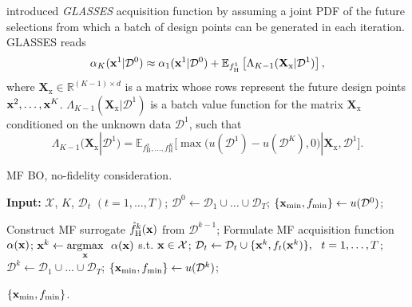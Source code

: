 \documentclass[journal ]{new-aiaa}
\begin{document}
\citet{Gonzalez2016} introduced \textit{GLASSES} acquisition function by assuming a joint PDF of the future selections from which a batch of design points can be generated in each iteration.
GLASSES reads
\begin{equation}\label{eqn54}
		\alpha_K({\bf x}^1|\mathcal{D}^0) \approx \alpha_1({\bf x}^1|\mathcal{D}^0) + \mathbb{E}_{f^1_\text{H}}\left[\Lambda_{K-1}(\textbf{X}_\text{x}|\mathcal{D}^1)\right],
\end{equation}
where 
$\textbf{X}_\text{x} \in \mathbb{R}^{(K-1) \times d}$ is a matrix whose rows represent the future design points ${\bf x}^2,\dots,{\bf x}^K$. $\Lambda_{K-1}(\textbf{X}_\text{x}|\mathcal{D}^1)$ is a batch value function for the matrix  $\textbf{X}_\text{x}$ conditioned on the unknown data $\mathcal{D}^1$, such that 
\begin{equation}\label{eqn55}
    \Lambda_{K-1}(\textbf{X}_\text{x}|\mathcal{D}^1)
    =\mathbb{E}_{f_\text{H}^2,\dots,f_\text{H}^K}\Bigg[\max\Big(u(\mathcal{D}^1)-u(\mathcal{D}^K),0  \Big)|\textbf{X}_\text{x},\mathcal{D}^1\Bigg].
\end{equation}

\begin{algorithm}
	\caption{MF BO, no-fidelity consideration.}\label{Algo3}
	\begin{algorithmic}[1]
		\State \textbf{Input:} $\mathcal{X}$, $K$, $\mathcal{D}_t$ $(t=1,\dots,T)$;
		\State $\mathcal{D}^0 \gets \mathcal{D}_1 \cup \dots \cup \mathcal{D}_T$;
		\State $\{{\bf x}_{\min},f_{\min}\} \gets u(\mathcal{D}^0)$; \label{Algo3:3}
		
		\State Construct MF surrogate $\hat{f}_\text{H}^k({\bf x})$ from $\mathcal{D}^{k-1}$;
		\State Formulate MF acquisition function $\alpha({\bf x})$; \label{Algo3:6}
		\State ${\bf x}^{k} \gets \underset{{\bf x}}{\mathrm{argmax}} \ \ \alpha({\bf x})$ s.t. ${\bf x} \in \mathcal{X}$;
		\State $\mathcal{D}_t \gets \mathcal{D}_t \cup \{{\bf x}^{k},f_t({\bf x}^{k})\}, \ \ t=1,\dots,T$;
		\State $\mathcal{D}^k \gets \mathcal{D}_1 \cup \dots \cup \mathcal{D}_T$;
		\State $\{{\bf x}_{\min},f_{\min}\} \gets u(\mathcal{D}^k)$; \label{Algo3:10}
		\EndFor
		
		\State \Return $\{{\bf x}_{\min},f_{\min}\}$.
	\end{algorithmic}
\end{algorithm}
\end{document}
